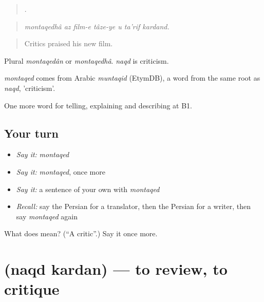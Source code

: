 \begin{quote}
      .
\end{quote}

\begin{quote}
\emph{montaqedhâ az film-e tâze-ye u ta'rif kardand.}
\end{quote}

\begin{quote}
Critics praised his new film.
\end{quote}

Plural \emph{montaqedân} or \emph{montaqedhâ}. \emph{naqd} is criticism.

\begin{cousinweb}
\emph{montaqed} comes from Arabic \emph{muntaqid} (EtymDB), a word from the same root as \emph{naqd}, 'criticism'.
\end{cousinweb}

\begin{grammarlens}[title={What you've built}]
One more word for telling, explaining and describing at B1.
\end{grammarlens}

\subsection*{Your turn}
\begin{itemize}
\raggedright
  \item \emph{Say it:} \emph{montaqed}
  \item \emph{Say it:} \emph{montaqed}, once more
  \item \emph{Say it:} a sentence of your own with \emph{montaqed}
  \item \emph{Recall:} say the Persian for a translator, then the Persian for a writer, then say \emph{montaqed} again
\end{itemize}

\begin{tcolorbox}[breakable,colback=teal!4,colframe=teal!35!black,title={Before you move on}]
What does  mean? (\textquotedblleft{}A critic\textquotedblright{}.) Say it once more.
\end{tcolorbox}
\section[\texorpdfstring{\fa{نقد} \fa{کردن} (naqd kardan)}{نقد کردن (naqd kardan)}]{  (naqd kardan) — to review, to critique}

